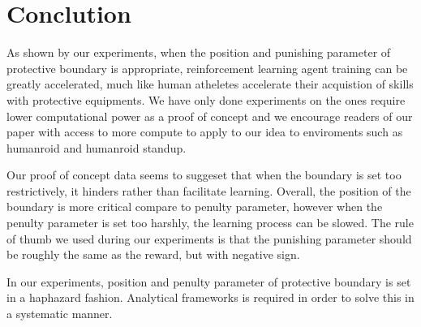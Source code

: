 \documentclass[journal]{IEEEtran}
\begin{document}
\section{Conclution}
As shown by our experiments, when the position and punishing parameter of protective boundary is appropriate, reinforcement learning agent training can be greatly accelerated, much like human atheletes accelerate their acquistion of skills with protective equipments. We have only done experiments on the ones require lower computational power as a proof of concept and we encourage readers of our paper with access to more compute to apply to our idea to enviroments such as humanroid and humanroid standup.

 Our proof of concept data seems to suggeset that when the boundary is set too restrictively, it hinders rather than facilitate learning. Overall, the position of the boundary is more critical compare to penulty parameter, however when the penulty parameter is set too harshly, the learning process can be slowed. The rule of thumb we used during our experiments is that the punishing parameter should be roughly the same as the reward, but with negative sign.

In our experiments, position and penulty parameter of protective boundary is set in a haphazard fashion. Analytical frameworks is required in order to solve this in a systematic manner.



\end{document}
